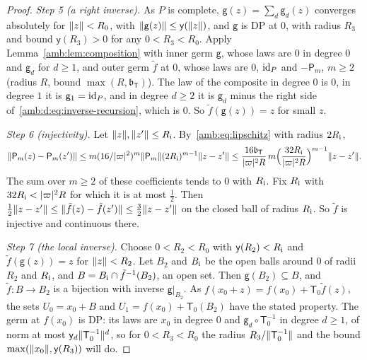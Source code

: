 \begin{proof}
\emph{Step 5 (a right inverse).} As $P$ is complete, $\mathsf g(z)=\sum_d\mathsf g_d(z)$ converges absolutely for
$\lVert z\rVert<R_0$, with $\lVert \mathsf g(z)\rVert\le\mathsf y(\lVert z\rVert)$, and $\mathsf g$ is DP at $0$, with radius $R_3$ and bound $\mathsf y(R_3)>0$ for any $0<R_3<R_0$. Apply
Lemma~\ref{amb:lem:composition} with inner germ $\mathsf g$, whose laws are $0$ in degree $0$ and $\mathsf g_d$ for $d\ge1$, and outer
germ $\tilde f$ at $0$, whose laws are $0$, $\mathrm{id}_P$ and $-\mathsf P_m$, $m\ge2$ (radius $R$, bound $\max(R,\mathfrak b_{\mathsf T})$). The law of the composite in degree $0$ is $0$, in
degree $1$ it is $\mathsf g_1=\mathrm{id}_P$, and in degree $d\ge2$ it is $\mathsf g_d$ minus the right side
of~\eqref{amb:d:eq:inverse-recursion}, which is $0$. So $\tilde f(\mathsf g(z))=z$ for small $z$.

\emph{Step 6 (injectivity).} Let $\lVert z\rVert,\lVert z'\rVert\le R_{\rm i}$. By~\eqref{amb:eq:lipschitz} with radius $2R_{\rm i}$,
\[
 \lVert \mathsf P_m(z)-\mathsf P_m(z')\rVert\le m(16/\lvert \varpi\rvert^2)^m\lVert \mathsf P_m\rVert(2R_{\rm i})^{m-1}\lVert z-z'\rVert
 \le\frac{16\mathfrak b_{\mathsf T}}{\lvert \varpi\rvert^2R}\,m\Bigl(\frac{32R_{\rm i}}{\lvert \varpi\rvert^2R}\Bigr)^{m-1}\lVert z-z'\rVert.
\]
The sum over $m\ge2$ of these coefficients tends to $0$ with $R_{\rm i}$. Fix $R_{\rm i}$ with $32R_{\rm i}<\lvert \varpi\rvert^2R$ for which it is at most
$\frac12$. Then
$\frac12\lVert z-z'\rVert\le\lVert \tilde f(z)-\tilde f(z')\rVert\le\frac32\lVert z-z'\rVert$ on the closed ball of radius $R_{\rm i}$. So $\tilde f$ is
injective and continuous there.

\emph{Step 7 (the local inverse).} Choose $0<R_2<R_0$ with $\mathsf y(R_2)<R_{\rm i}$ and $\tilde f(\mathsf g(z))=z$ for $\lVert z\rVert<R_2$. Let
$B_2$ and $B_{\rm i}$ be the open balls around $0$ of radii $R_2$ and $R_{\rm i}$, and $B=B_{\rm i}\cap\tilde f^{-1}(B_2)$, an open set. Then
$\mathsf g(B_2)\subseteq B$, and $\tilde f\colon B\to B_2$ is a bijection with inverse $\mathsf g|_{B_2}$. As $f(x_0+z)=f(x_0)+\mathsf T_0\tilde f(z)$, the
sets $U_0=x_0+B$ and $U_1=f(x_0)+\mathsf T_0(B_2)$ have the stated property. The germ at $f(x_0)$ is DP: its laws are $x_0$ in degree $0$ and $\mathsf g_d\circ\mathsf T_0^{-1}$ in degree $d\ge1$,
of norm at most $\mathsf y_d\lVert \mathsf T_0^{-1}\rVert^d$, so for $0<R_3<R_0$ the radius $R_3/\lVert \mathsf T_0^{-1}\rVert$ and the bound $\max(\lVert x_0\rVert,\mathsf y(R_3))$ will do.
\end{proof}

